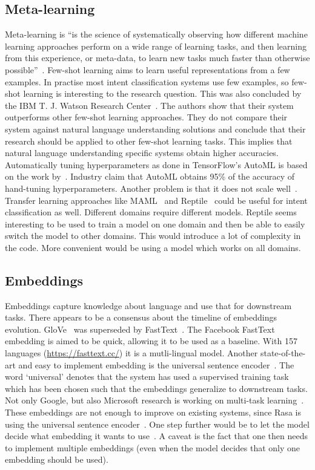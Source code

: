\subsection{Meta-learning}
\label{subsec:meta-learning}
Meta-learning is ``is the science of systematically observing how different machine learning approaches perform on a wide range of learning tasks, and then learning from this experience, or meta-data, to learn new tasks much faster than otherwise possible''~\citet{vanschoren2018meta}.
Few-shot learning aims to learn useful representations from a few examples.
In practise most intent classification systems use few examples, so few-shot learning is interesting to the research question.
This was also concluded by the IBM T. J. Watson Research Center~\citep{yu2018diverse}.
The authors show that their system outperforms other few-shot learning approaches.
They do not compare their system against natural language understanding solutions and conclude that their research should be applied to other few-shot learning tasks.
This implies that natural language understanding specific systems obtain higher accuracies.
Automatically tuning hyperparameters as done in TensorFlow's AutoML is based on the work by~\citet{andrychowicz2016learning}.
Industry claim that AutoML obtains 95\% of the accuracy of hand-tuning hyperparameters.
Another problem is that it does not scale well~\citep{jones2017}.
Transfer learning approaches like MAML~\citep{finn2017model} and Reptile~\citep{nichol2018reptile} could be useful for intent classification as well.
Different domains require different models.
Reptile seems interesting to be used to train a model on one domain and then be able to easily switch the model to other domains.
This would introduce a lot of complexity in the code.
More convenient would be using a model which works on all domains.

\subsection{Embeddings}
\label{subsec:embeddings}
Embeddings capture knowledge about language and use that for downstream tasks.
There appears to be a consensus about the timeline of embeddings evolution.
GloVe~\citep{pennington2014} was superseded by FastText~\citep{joulin2016bag}.
The Facebook FastText embedding is aimed to be quick, allowing it to be used as a baseline.
With 157 languages (\url{https://fasttext.cc/}) it is a mutli-lingual model.
Another state-of-the-art and easy to implement embedding is the universal sentence encoder~\citep{cer2018universal}.
The word `universal' denotes that the system has used a supervised training task which has been chosen such that the embeddings generalize to downstream tasks.
Not only Google, but also Microsoft research is working on multi-task learning~\citep{subramanian2018learning}.
These embeddings are not enough to improve on existing systems, since Rasa is using the universal sentence encoder~\citep{wiese2018}.
One step further would be to let the model decide what embedding it wants to use~\citep{kiela2018dynamic}.
A caveat is the fact that one then needs to implement multiple embeddings (even when the model decides that only one embedding should be used).
